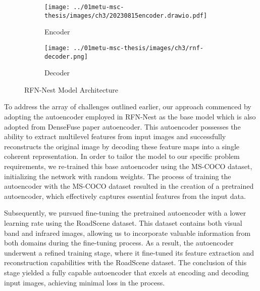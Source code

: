 \begin{figure}[htbp]
    \centering
    \begin{subfigure}[b]{\textwidth}
        \centering
        \texttt{[image: ../01metu-msc-thesis/images/ch3/20230815encoder.drawio.pdf]}
        \caption{Encoder}
        \label{fig:ch3:encoder}
    \end{subfigure}
    \vspace{0.01cm}
    \begin{subfigure}[b]{\textwidth}
        \centering
        \texttt{[image: ../01metu-msc-thesis/images/ch3/rnf-decoder.png]}
        \caption{Decoder}
        \label{fig:ch3:rfnnest:decoder}
    \end{subfigure}
    \caption{RFN-Nest Model Architecture\cite{li2021rfn}}
    \label{fig:ch3:rfnnest}
\end{figure}

To address the array of challenges outlined earlier, our approach commenced by adopting the autoencoder employed in RFN-Nest \cite{li2021rfn} as the base model which is also adopted from DenseFuse \cite{li2019infrared} paper autoencoder. This autoencoder possesses the ability to extract multilevel features from input images and successfully reconstructs the original image by decoding these feature maps into a single coherent representation. In order to tailor the model to our specific problem requirements, we re-trained this base autoencoder using the MS-COCO \cite{lin2014microsoft} dataset, initializing the network with random weights. The process of training the autoencoder with the MS-COCO dataset resulted in the creation of a pretrained autoencoder, which effectively captures essential features from the input data.

Subsequently, we pursued fine-tuning the pretrained autoencoder with a lower learning rate using the RoadScene \cite{xu2020aaai} dataset. This dataset contains both visual band and infrared images, allowing us to incorporate valuable information from both domains during the fine-tuning process. As a result, the autoencoder underwent a refined training stage, where it fine-tuned its feature extraction and reconstruction capabilities with the RoadScene dataset. The conclusion of this stage yielded a fully capable autoencoder that excels at encoding and decoding input images, achieving minimal loss in the process.

